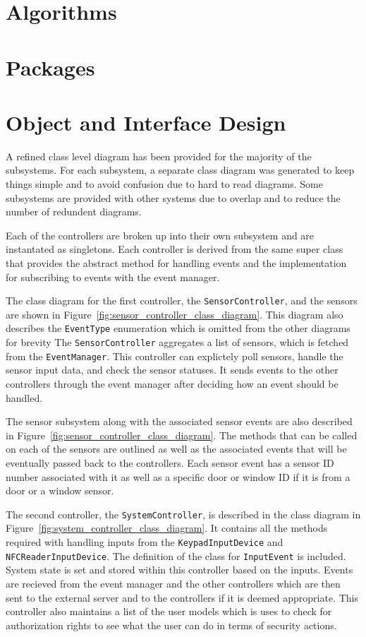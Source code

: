 \documentclass{report}
\begin{document}
\section{Algorithms}

\section{Packages}

\section{Object and Interface Design}
A refined class level diagram has been provided for the majority of the
subsystems. For each subsystem, a separate class diagram was generated to keep
things simple and to avoid confusion due to hard to read diagrams. Some
subsystems are provided with other systems due to overlap and to reduce the
number of redundent diagrams.

Each of the controllers are broken up into their own subsystem and are
instantated as singletons. Each controller is derived from the same super class
that provides the abstract method for handling events and the
implementation for subscribing to events with the event manager.

The class diagram for the first controller, the \texttt{SensorController}, and
the sensors are shown in Figure~\ref{fig:sensor_controller_class_diagram}. This
diagram also describes the \texttt{EventType} enumeration which is omitted from
the other diagrams for brevity The \texttt{SensorController} aggregates a list
of sensors, which is fetched from the \texttt{EventManager}. This controller can
explictely poll sensors, handle the sensor input data, and check the sensor
statuses. It sends events to the other controllers through the event manager
after deciding how an event should be handled. 

The sensor subsystem along with the associated sensor events are also described
in Figure~\ref{fig:sensor_controller_class_diagram}. The methods that can be
called on each of the sensors are outlined as well as the associated events that
will be eventually passed back to the controllers. Each sensor event has a
sensor ID number associated with it as well as a specific door or window ID
if it is from a door or a window sensor.

The second controller, the \texttt{SystemController}, is described in the class
diagram in Figure~\ref{fig:system_controller_class_diagram}. It contains all
the methods required with handling inputs from the \texttt{KeypadInputDevice}
and \texttt{NFCReaderInputDevice}. The definition of the class for
\texttt{InputEvent} is included. System state is set and stored within this
controller based on the inputs. Events are recieved from the event manager and
the other controllers which are then sent to the external server and to the
controllers if it is deemed appropriate. This controller also maintains a list
of the user models which is uses to check for authorization rights to see what
the user can do in terms of security actions.
\end{document}
